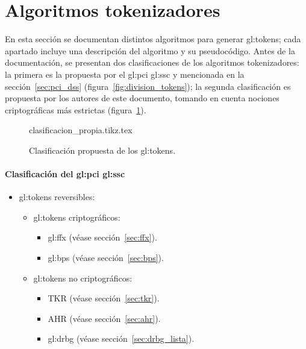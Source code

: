 %
%

\section{Algoritmos tokenizadores}
\label{sec:algoritmos}

En esta sección se documentan distintos algoritmos para generar
\glspl{gl:token}; cada apartado incluye una descripción del
algoritmo y su pseudocódigo. Antes de la documentación, se presentan
dos clasificaciones de los algoritmos tokenizadores: la primera es la propuesta
por el \gls{gl:pci} \gls{gl:ssc} y mencionada en la sección~\ref{sec:pci_dss}
(figura~\ref{fig:division_tokens}); la segunda clasificación es propuesta por
los autores de este documento, tomando en cuenta nociones criptográficas más
estrictas (figura~\ref{fig:division_propia}).

\begin{figure}
  \begin{center}
    {clasificacion_propia.tikz.tex}
    \caption{Clasificación propuesta de los \glspl{gl:token}.}
    \label{fig:division_propia}
  \end{center}
\end{figure}

\paragraph{Clasificación del
  \texorpdfstring{\acrlong{gl:pci}}{PCI} \texorpdfstring{\acrlong{gl:ssc}}{SSC}}

\begin{itemize}
  \item \Glspl{gl:token} reversibles:
    \begin{itemize}
      \item \Glspl{gl:token} criptográficos:
        \begin{itemize}
          \item \Gls{gl:ffx} (véase sección~\ref{sec:ffx}).
          \item \Gls{gl:bps} (véase sección~\ref{sec:bps}).
        \end{itemize}
      \item \Glspl{gl:token} no criptográficos:
        \begin{itemize}
          \item TKR (véase sección~\ref{sec:tkr}).
          \item AHR (véase sección~\ref{sec:ahr}).
          \item \Gls{gl:drbg} (véase sección~\ref{sec:drbg_lista}).
        \end{itemize}
    \end{itemize}
\end{itemize}


